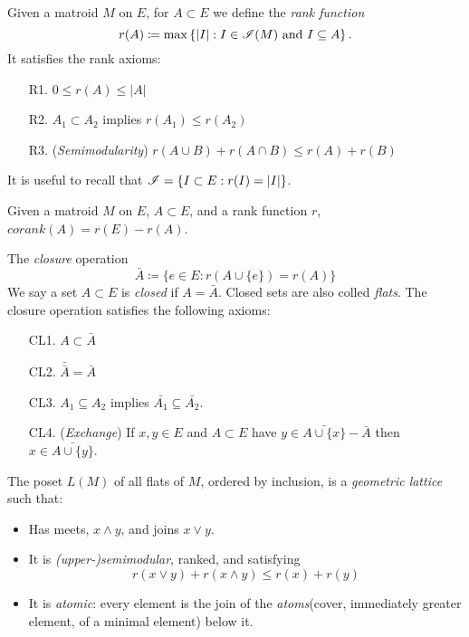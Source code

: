 \begin{definition}
    Given a matroid $M$ on $E$, for $A \subset E$ we define the \textit{rank function}
    $$ r(A) \coloneqq \max \left\lbrace |I|: I \in \mathscr{I}(M) \text{ and } I \subseteq A \right\rbrace.$$
    It satisfies the rank axioms:
    \begin{enumerate}
        \item[R1.] $0 \leq r(A) \leq |A|$
        \item[R2.] $A_1 \subset A_2$ implies $r(A_1) \leq r(A_2)$
        \item[R3.] (\textit{Semimodularity}) $r(A \cup B) + r(A \cap B) \leq r(A) + r(B)$
    \end{enumerate}
    It is useful to recall that $\mathscr{I} = \{ I \subset E : r(I) = |I| \}$.
\end{definition}

\begin{definition}[Corank]
    Given a matroid $M$ on $E$, $A \subset E$, and a rank function $r$, $corank(A) = r(E) - r(A)$.
\end{definition}

\begin{definition}
    The \textit{closure} operation
    $$\bar{A} \coloneqq \{ e \in E : r(A \cup \{ e \}) = r(A) \}$$
    We say a set $A \subset E$ is \textit{closed} if $A = \bar{A}$.
    Closed sets are also colled \textit{flats}.
    The closure operation satisfies the following axioms:
    \begin{enumerate}
        \item[CL1.] $A \subset \bar{A}$
        \item[CL2.] $\bar{\bar{A}} = \bar{A}$
        \item[CL3.] $A_1 \subseteq A_2$ implies $\bar{A_1} \subseteq \bar{A_2}$.
        \item[CL4.] (\textit{Exchange}) If $x,y \in E$ and $A \subset E$ have $y \in \bar{A \cup \{x \}} - \bar{A}$ then $x \in \bar{A \cup \{ y \}}$.
    \end{enumerate}
\end{definition}

\begin{definition}
    The poset $L(M)$ of all flats of $M$, ordered by inclusion, is a \textit{geometric lattice} such that:
    \begin{itemize}
        \item Has meets, $x \wedge y$, and joins $x \vee y$.
        \item It is \textit{(upper-)semimodular}, ranked, and satisfying
            $$ r(x \vee y) + r(x \wedge y) \leq r(x) + r(y) $$
        \item It is \textit{atomic}: every element is the join of the \textit{atoms}(cover, immediately greater element, of a minimal element) below it.
    \end{itemize}
\end{definition}

